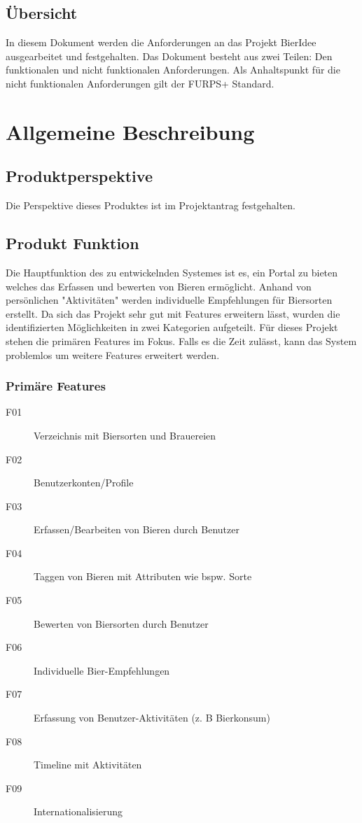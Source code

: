 \documentclass[10pt,a4paper]{scrartcl}
\begin{document}
\subsection{Übersicht}
In diesem Dokument werden die Anforderungen an das Projekt BierIdee ausgearbeitet und festgehalten. Das Dokument besteht aus zwei Teilen: Den funktionalen und nicht funktionalen Anforderungen. Als Anhaltspunkt für die nicht funktionalen Anforderungen gilt der FURPS+ Standard.
\newpage


\section{Allgemeine Beschreibung}

\subsection{Produktperspektive}
Die Perspektive dieses Produktes ist im Projektantrag festgehalten.

\subsection{Produkt Funktion}
Die Hauptfunktion des zu entwickelnden Systemes ist es, ein Portal zu bieten welches das Erfassen und bewerten von Bieren ermöglicht. Anhand von persönlichen "Aktivitäten" werden individuelle Empfehlungen für Biersorten erstellt. Da sich das Projekt sehr gut mit Features erweitern lässt, wurden die identifizierten Möglichkeiten in zwei Kategorien aufgeteilt. Für dieses Projekt stehen die primären Features im Fokus. Falls es die Zeit zulässt, kann das System problemlos um weitere Features erweitert werden.

\subsubsection{Primäre Features}
\begin{description}
\item[F01] Verzeichnis mit Biersorten und Brauereien
\item[F02] Benutzerkonten/Profile
\item[F03] Erfassen/Bearbeiten von Bieren durch Benutzer
\item[F04] Taggen von Bieren mit Attributen wie bspw. Sorte
\item[F05] Bewerten von Biersorten durch Benutzer
\item[F06] Individuelle Bier-Empfehlungen
\item[F07] Erfassung von Benutzer-Aktivitäten (z. B Bierkonsum)
\item[F08] Timeline mit Aktivitäten
\item[F09] Internationalisierung 
\end{description}
\newpage
\end{document}
